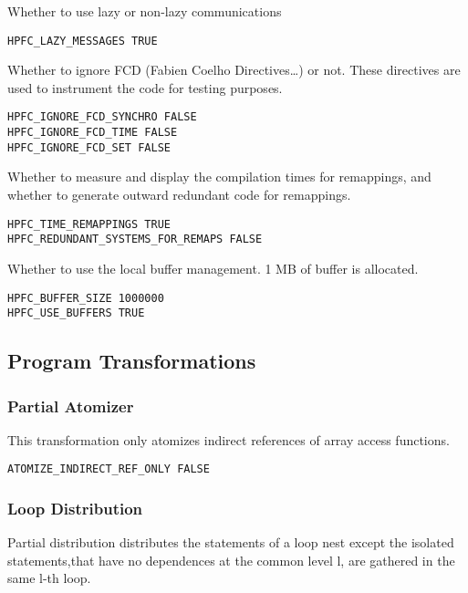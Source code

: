   Whether to use lazy or non-lazy communications

\begin{verbatim}
HPFC_LAZY_MESSAGES TRUE
\end{verbatim}

Whether to ignore FCD (Fabien Coelho Directives\ldots) or not. These
directives are used to instrument the code for testing purposes.

\begin{verbatim}
HPFC_IGNORE_FCD_SYNCHRO FALSE
HPFC_IGNORE_FCD_TIME FALSE
HPFC_IGNORE_FCD_SET FALSE
\end{verbatim}

Whether to measure and display the compilation times for remappings,
and whether to generate outward redundant code for remappings.

\begin{verbatim}
HPFC_TIME_REMAPPINGS TRUE
HPFC_REDUNDANT_SYSTEMS_FOR_REMAPS FALSE
\end{verbatim}

Whether to use the local buffer management. 1 MB of buffer is allocated.

\begin{verbatim}
HPFC_BUFFER_SIZE 1000000
HPFC_USE_BUFFERS TRUE
\end{verbatim}


\subsection{Program Transformations}


\subsubsection{Partial Atomizer}

This transformation only atomizes indirect references of array access
functions.

\begin{verbatim}
ATOMIZE_INDIRECT_REF_ONLY FALSE
\end{verbatim}

\subsubsection{Loop Distribution}

Partial distribution distributes the statements of a loop nest except
 the isolated statements,that have no dependences at the common level l,
 are gathered in the same l-th loop.

